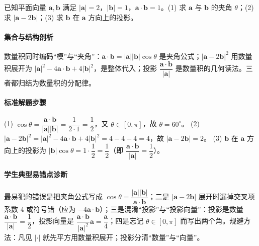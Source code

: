 \begin{problem}
已知平面向量 $\bm a,\bm b$ 满足 $|\bm a|=2$，$|\bm b|=1$，$\bm a\cdot\bm b=1$。(1) 求 $\bm a$ 与 $\bm b$ 的夹角 $\theta$；(2) 求 $|\bm a-2\bm b|$；(3) 求 $\bm b$ 在 $\bm a$ 方向上的投影。
\end{problem}
\begin{solution}
\paragraph{集合与结构剖析}
数量积同时编码“模”与“夹角”：$\bm a\cdot\bm b=|\bm a||\bm b|\cos\theta$ 是夹角公式；$|\bm a-2\bm b|^2$ 用数量积展开为 $|\bm a|^2-4\bm a\cdot\bm b+4|\bm b|^2$，是整体代入；投影 $\dfrac{\bm a\cdot\bm b}{|\bm a|}$ 是数量积的几何读法。三者都归结为数量积的分配律。
\paragraph{标准解题步骤}
(1) $\cos\theta=\dfrac{\bm a\cdot\bm b}{|\bm a||\bm b|}=\dfrac{1}{2\cdot1}=\dfrac12$，又 $\theta\in[0,\pi]$，故 $\theta=60^\circ$。
(2) $|\bm a-2\bm b|^2=|\bm a|^2-4\bm a\cdot\bm b+4|\bm b|^2=4-4+4=4$，故 $|\bm a-2\bm b|=2$。
(3) $\bm b$ 在 $\bm a$ 方向上的投影为 $|\bm b|\cos\theta=1\cdot\dfrac12=\dfrac12$（即 $\dfrac{\bm a\cdot\bm b}{|\bm a|}=\dfrac12$）。
\paragraph{学生典型易错点诊断}
最易犯的错误是把夹角公式写成 $\cos\theta=\dfrac{|\bm a||\bm b|}{\bm a\cdot\bm b}$；二是 $|\bm a-2\bm b|$ 展开时漏掉交叉项系数 $4$ 或符号错（应为 $-4\bm a\cdot\bm b$）；三是混淆“投影”与“投影向量”：投影是数量 $\dfrac{\bm a\cdot\bm b}{|\bm a|}=\dfrac12$，投影向量是 $\dfrac{\bm a\cdot\bm b}{|\bm a|^2}\bm a=\dfrac{\bm a}{4}$；四是忘记 $\theta\in[0,\pi]$ 而写出两个角。规避方法：凡见 $|\cdot|$ 就先平方用数量积展开；投影分清“数量”与“向量”。
\end{solution}

